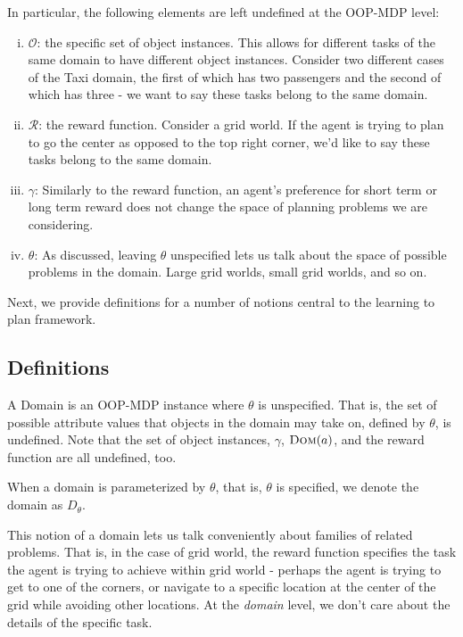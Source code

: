 \documentclass[11pt]{article}
\begin{document}
In particular, the following elements are left undefined at the OOP-MDP level:
\begin{enumerate}[(i)]
\item $\mathcal{O}$: the specific set of object instances. This allows for different tasks of the same domain to have different object instances. Consider two different cases of the Taxi domain, the first of which has two passengers and the second of which has three - we want to say these tasks belong to the same domain.
\item $\mathcal{R}$: the reward function. Consider a grid world. If the agent is trying to plan to go the center as opposed to the top right corner, we'd like to say these tasks belong to the same domain.
\item $\gamma$: Similarly to the reward function, an agent's preference for short term or long term reward does not change the space of planning problems we are considering.
\item $\theta $: As discussed, leaving $\theta$ unspecified lets us talk about the space of possible problems in the domain. Large grid worlds, small grid worlds, and so on.
\end{enumerate}

Next, we provide definitions for a number of notions central to the learning to plan framework.

\subsection{Definitions}


{ A \textup{Domain} is an OOP-MDP instance where $\theta$ is unspecified. That is, the set of possible attribute values that objects in the domain may take on, defined by $\theta$, is undefined. Note that the set of object instances, $\gamma$, $\textsc{Dom}(a)$, and the reward function are all undefined, too.}

When a domain is parameterized by $\theta$, that is, $\theta$ is specified, we denote the domain as $D_\theta$.

This notion of a domain lets us talk conveniently about families of related problems. That is, in the case of grid world, the reward function specifies the task the agent is trying to achieve within grid world - perhaps the agent is trying to get to one of the corners, or navigate to a specific location at the center of the grid while avoiding other locations. At the {\it domain} level, we don't care about the details of the specific task.
\end{document}

